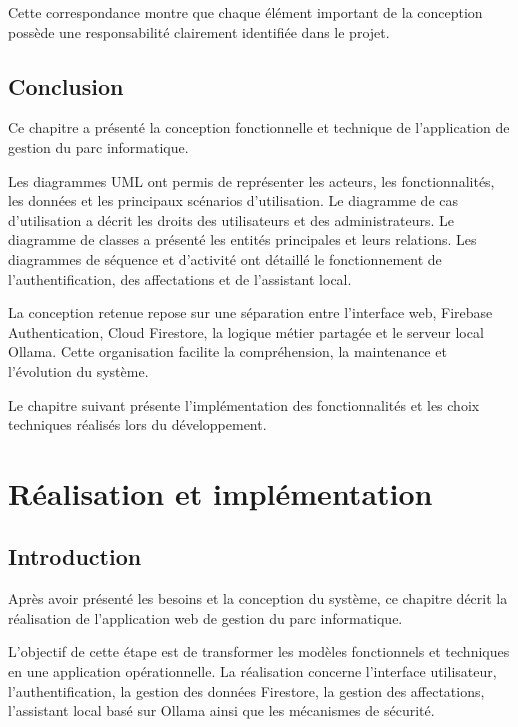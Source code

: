 \documentclass{rapportENSIAS}
\begin{document}
Cette correspondance montre que chaque élément important de la conception possède une responsabilité clairement identifiée dans le projet.

\section{Conclusion}

Ce chapitre a présenté la conception fonctionnelle et technique de l’application de gestion du parc informatique.

Les diagrammes UML ont permis de représenter les acteurs, les fonctionnalités, les données et les principaux scénarios d’utilisation. Le diagramme de cas d’utilisation a décrit les droits des utilisateurs et des administrateurs. Le diagramme de classes a présenté les entités principales et leurs relations. Les diagrammes de séquence et d’activité ont détaillé le fonctionnement de l’authentification, des affectations et de l’assistant local.

La conception retenue repose sur une séparation entre l’interface web, Firebase Authentication, Cloud Firestore, la logique métier partagée et le serveur local Ollama. Cette organisation facilite la compréhension, la maintenance et l’évolution du système.

Le chapitre suivant présente l’implémentation des fonctionnalités et les choix techniques réalisés lors du développement.


\chapter{Réalisation et implémentation}

\section{Introduction}

Après avoir présenté les besoins et la conception du système, ce chapitre décrit la réalisation de l’application web de gestion du parc informatique.

L’objectif de cette étape est de transformer les modèles fonctionnels et techniques en une application opérationnelle. La réalisation concerne l’interface utilisateur, l’authentification, la gestion des données Firestore, la gestion des affectations, l’assistant local basé sur Ollama ainsi que les mécanismes de sécurité.
\end{document}
